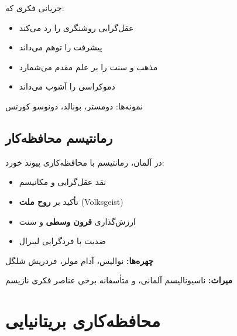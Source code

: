 \begin{defbox}
جریانی فکری که:
\begin{itemize}[nosep]
    \item عقل‌گرایی روشنگری را رد می‌کند
    \item پیشرفت را توهم می‌داند
    \item مذهب و سنت را بر علم مقدم می‌شمارد
    \item دموکراسی را آشوب می‌داند
\end{itemize}
نمونه‌ها: دومستر، بونالد، دونوسو کورتس
\end{defbox}

\subsection{رمانتیسم محافظه‌کار}

\begin{historybox}
در آلمان، رمانتیسم با محافظه‌کاری پیوند خورد:
\begin{itemize}[nosep]
    \item نقد عقل‌گرایی و مکانیسم
    \item تأکید بر \textbf{روح ملت} (Volksgeist)
    \item ارزش‌گذاری \textbf{قرون وسطی} و سنت
    \item ضدیت با فردگرایی لیبرال
\end{itemize}

\textbf{چهره‌ها:} نوالیس، آدام مولر، فردریش شلگل

\textbf{میراث:} ناسیونالیسم آلمانی، و متأسفانه برخی عناصر فکری نازیسم
\end{historybox}

\section{محافظه‌کاری بریتانیایی}

